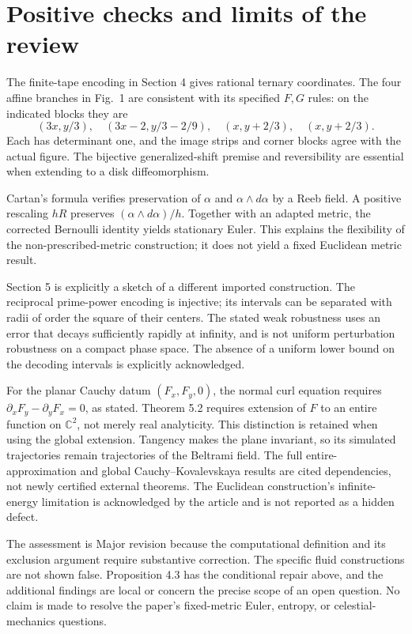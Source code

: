 \documentclass[10pt]{article}
\begin{document}
\section*{Positive checks and limits of the review}
The finite-tape encoding in Section 4 gives rational ternary coordinates. The four affine branches in Fig. 1 are consistent with its specified \(F,G\) rules: on the indicated blocks they are \[(3x,y/3),\quad(3x-2,y/3-2/9),\quad
 (x,y+2/3),\quad(x,y+2/3).\] Each has determinant one, and the image strips and corner blocks agree with the actual figure. The bijective generalized-shift premise and reversibility are essential when extending to a disk diffeomorphism.\par
Cartan’s formula verifies preservation of \(\alpha\) and \(\alpha\wedge d\alpha\) by a Reeb field. A positive rescaling \(hR\) preserves \((\alpha\wedge d\alpha)/h\). Together with an adapted metric, the corrected Bernoulli identity yields stationary Euler. This explains the flexibility of the non-prescribed-metric construction; it does not yield a fixed Euclidean metric result.\par
Section 5 is explicitly a sketch of a different imported construction. The reciprocal prime-power encoding is injective; its intervals can be separated with radii of order the square of their centers. The stated weak robustness uses an error that decays sufficiently rapidly at infinity, and is not uniform perturbation robustness on a compact phase space. The absence of a uniform lower bound on the decoding intervals is explicitly acknowledged.\par
For the planar Cauchy datum \((F_x,F_y,0)\), the normal curl equation requires \(\partial_xF_y-\partial_yF_x=0\), as stated. Theorem 5.2 requires extension of \(F\) to an entire function on \(\mathbb C^2\), not merely real analyticity. This distinction is retained when using the global extension. Tangency makes the plane invariant, so its simulated trajectories remain trajectories of the Beltrami field. The full entire-approximation and global Cauchy–Kovalevskaya results are cited dependencies, not newly certified external theorems. The Euclidean construction’s infinite-energy limitation is acknowledged by the article and is not reported as a hidden defect.\par
The assessment is Major revision because the computational definition and its exclusion argument require substantive correction. The specific fluid constructions are not shown false. Proposition 4.3 has the conditional repair above, and the additional findings are local or concern the precise scope of an open question. No claim is made to resolve the paper’s fixed-metric Euler, entropy, or celestial-mechanics questions.\par
\end{document}
